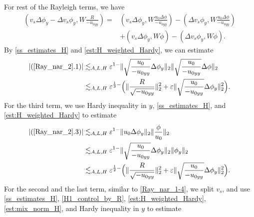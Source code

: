 \documentclass[reqno, 11pt]{amsart}
\theoremstyle{plain}
\theoremstyle{definition}
\theoremstyle{remark}
\numberwithin{equation}{section}
\begin{document}
For rest of the Rayleigh terms, we have
\begin{equation}\label{Ray_nar_2}
\begin{aligned}
(v_s \Delta \phi_y - \Delta v_s \phi_y,  W \frac{R}{-u_{0yy}}) =& (v_s \Delta \phi_y, W \frac{u_0 \Delta \phi}{-u_{0yy}} ) - (\Delta v_s \phi_y, W \frac{u_0 \Delta \phi}{-u_{0yy}} )\\
& + (v_s \Delta \phi_y, W \phi) - (\Delta v_s \phi_y, W \phi).
\end{aligned}
\end{equation}
By \eqref{ss_estimates_H} and \eqref{est:H_weighted_Hardy}, we can estimate
\begin{equation}\label{Ray_nar_2-1}
\begin{aligned}
|(\ref{Ray_nar_2}.1)| &\lesssim_{A,L,H} \varepsilon^{1-} \| \sqrt{\frac{u_0}{-u_{0yy}}} \Delta \phi_{y}\|_2  \| \sqrt{\frac{u_0}{-u_{0yy}}} \Delta \phi\|_2  \\
&\lesssim_{A,L,H}  \varepsilon^{\frac{1}{3}-} \Big( \|\frac{R}{\sqrt{-u_{0yy}}}\|_2^2 + \varepsilon \| \sqrt{\frac{u_0}{-u_{0yy}}} \Delta \phi_{y}\|_2^2\Big).
\end{aligned}
\end{equation}
For the third term, we use Hardy inequality in $y$, \eqref{ss_estimates_H}, and \eqref{est:H_weighted_Hardy} to estimate
\begin{equation}\label{Ray_nar_2-2}
\begin{aligned}
|(\ref{Ray_nar_2}.3)| &\lesssim_{A,L,H} \varepsilon^{1-} \|u_0 \Delta \phi_y\|_2 \| \frac{\phi}{u_0} \|_2\\
&\lesssim_{A,L,H} \varepsilon^{1-} \| \sqrt{\frac{u_0}{-u_{0yy}}} \Delta \phi_{y}\|_2 \|\phi_y\|_2\\
&\lesssim_{A,L,H} \varepsilon^{\frac{1}{2}-} \Big( \|\frac{R}{\sqrt{-u_{0yy}}}\|_2^2 + \varepsilon \| \sqrt{\frac{u_0}{-u_{0yy}}} \Delta \phi_{y}\|_2^2\Big).
\end{aligned}
\end{equation}
For the second and the last term, similar to \eqref{Ray_nar_1-4}, we split $v_s$, and use \eqref{ss_estimates_H}, \eqref{H1_control_by_R}, \eqref{est:H_weighted_Hardy}, \eqref{est:mix_norm_H}, and Hardy inequality in $y$ to estimate
\end{document}
